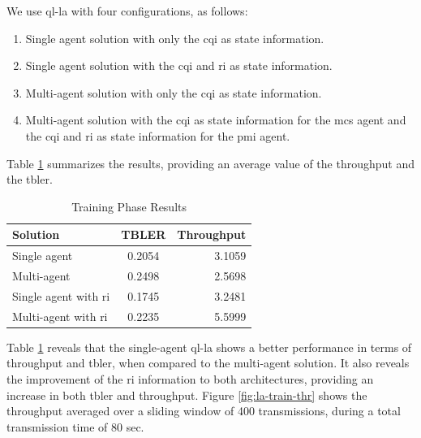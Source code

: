 %
We use \gls{ql-la} with four configurations, as follows:
\begin{enumerate}
    \item Single agent solution with only the \gls{cqi} as state information.
    \item Single agent solution with the \gls{cqi} and \gls{ri} as state information.
    \item Multi-agent solution with only the \gls{cqi} as state information.
    \item Multi-agent solution with the \gls{cqi} as state information for the \gls{mcs} agent and the \gls{cqi} and \gls{ri} as state information for the \gls{pmi} agent.
\end{enumerate}
%
Table \ref{tab:la-train-results} summarizes the results, providing  an average value of the throughput  and the \gls{tbler}.
%
\begin{table}[!htb]
	\centering
	\caption{Training Phase Results}
	\label{tab:la-train-results}
	\begin{tabularx}{0.7\columnwidth}{l c r}
		\toprule
		Solution                      &   TBLER   & Throughput    \\
		\midrule
		Single agent                  &   0.2054  & 3.1059        \\
		Multi-agent                   &   0.2498  & 2.5698        \\
        Single agent with \gls{ri}    &   0.1745  & 3.2481        \\
        Multi-agent with \gls{ri}     &   0.2235  & 5.5999        \\
		\bottomrule
	\end{tabularx}
\end{table}

Table \ref{tab:la-train-results} reveals that the single-agent \gls{ql-la} shows a better performance in terms of throughput and \gls{tbler}, when compared to the multi-agent solution.
%
It also reveals the improvement of the \gls{ri} information to both architectures, providing an increase in both \gls{tbler} and throughput.
%
Figure \ref{fig:la-train-thr} shows the throughput averaged over a sliding window of 400 transmissions, during a total transmission time of 80 sec.


